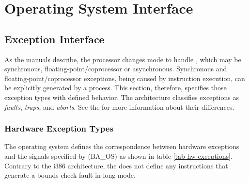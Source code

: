 \section{Operating System Interface}

\subsection{Exception Interface}

As the \xARCH manuals describe, the processor changes mode to handle
\emph{,} which may be synchronous,
floating-point/coprocessor or asynchronous.
Synchronous and floating-point/coprocessor exceptions,
being caused by instruction execution, can be explicitly generated
by a process. This section, therefore, specifies those exception types
with defined behavior. The \xARCH architecture classifies exceptions as
\emph{faults}, \emph{traps}, and \emph{aborts}. See the \intelabi
for more information about their differences.

\subsubsection{Hardware Exception Types}
The operating system defines the correspondence between hardware
exceptions and the signals specified by (BA\_OS)
as shown in table \ref{tab-hw-exceptions}. Contrary to the i386
architecture, the \xARCH does not define any instructions that
generate a bounds check fault in long mode.

